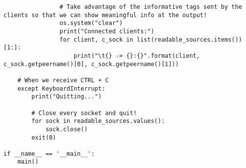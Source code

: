 \documentclass[landscape]{article}
\begin{document}
\begin{verbatim}
                # Take advantage of the informative tags sent by the clients so that we can show meaningful info at the output!
                os.system("clear")
                print("Connected clients:")
                for client, c_sock in list(readable_sources.items())[1:]:
                    print("\t{} -> {}:{}".format(client, c_sock.getpeername()[0], c_sock.getpeername()[1]))

    # When we receive CTRL + C
    except KeyboardInterrupt:
        print("Quitting...")

        # Close every socket and quit!
        for sock in readable_sources.values():
            sock.close()
        exit(0)

if __name__ == '__main__':
    main()
            \end{verbatim}
\end{document}
